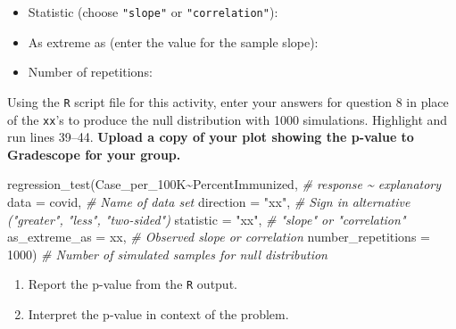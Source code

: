 \documentclass[
]{report}
\newenvironment{Shaded}{\begin{snugshade}}{\end{snugshade}}
\newcommand{\AttributeTok}[1]{\textcolor[rgb]{0.77,0.63,0.00}{#1}}
\newcommand{\CommentTok}[1]{\textcolor[rgb]{0.56,0.35,0.01}{\textit{#1}}}
\newcommand{\DecValTok}[1]{\textcolor[rgb]{0.00,0.00,0.81}{#1}}
\newcommand{\FunctionTok}[1]{\textcolor[rgb]{0.00,0.00,0.00}{#1}}
\newcommand{\NormalTok}[1]{#1}
\newcommand{\SpecialCharTok}[1]{\textcolor[rgb]{0.00,0.00,0.00}{#1}}
\newcommand{\StringTok}[1]{\textcolor[rgb]{0.31,0.60,0.02}{#1}}
\providecommand{\tightlist}{%
  \setlength{\itemsep}{0pt}\setlength{\parskip}{0pt}}
\begin{document}
\vspace{.2in}

\begin{itemize}
\tightlist
\item
  Statistic (choose \texttt{"slope"} or \texttt{"correlation"}):
\end{itemize}

\vspace{.2in}

\begin{itemize}
\tightlist
\item
  As extreme as (enter the value for the sample slope):
\end{itemize}

\vspace{0.2in}

\begin{itemize}
\tightlist
\item
  Number of repetitions:
\end{itemize}

\vspace{.2in}

Using the \texttt{R} script file for this activity, enter your answers for question 8 in place of the \texttt{xx}'s to produce the null distribution with 1000 simulations. Highlight and run lines 39--44. \textbf{Upload a copy of your plot showing the p-value to Gradescope for your group.}

\begin{Shaded}
\begin{Highlighting}[]
\FunctionTok{regression\_test}\NormalTok{(Case\_per\_100K}\SpecialCharTok{\textasciitilde{}}\NormalTok{PercentImmunized, }\CommentTok{\# response \textasciitilde{} explanatory}
               \AttributeTok{data =}\NormalTok{ covid, }\CommentTok{\# Name of data set}
               \AttributeTok{direction =} \StringTok{"xx"}\NormalTok{, }\CommentTok{\# Sign in alternative ("greater", "less", "two{-}sided")}
               \AttributeTok{statistic =} \StringTok{"xx"}\NormalTok{, }\CommentTok{\# "slope" or "correlation"}
               \AttributeTok{as\_extreme\_as =}\NormalTok{ xx, }\CommentTok{\# Observed slope or correlation}
               \AttributeTok{number\_repetitions =} \DecValTok{1000}\NormalTok{) }\CommentTok{\# Number of simulated samples for null distribution}
       
\end{Highlighting}
\end{Shaded}

\begin{enumerate}
\def\labelenumi{\arabic{enumi}.}
\setcounter{enumi}{8}
\item
  Report the p-value from the \texttt{R} output.
  \vspace{0.3in}
\item
  Interpret the p-value in context of the problem.
  \vspace{0.8in}
\end{enumerate}
\end{document}
